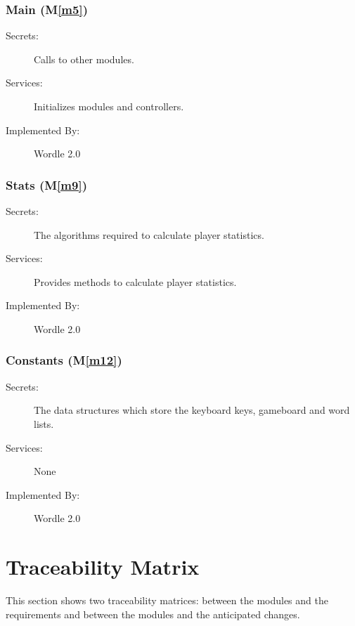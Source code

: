 \documentclass[12pt, titlepage]{article}
\newcommand{\mref}[1]{M\ref{#1}}
\begin{document}
	\subsubsection{Main (\mref{m5})}
	\begin{description}
		\item[Secrets:]Calls to other modules.
		\item[Services:]Initializes modules and controllers.
		\item[Implemented By:] Wordle 2.0
	\end{description}
	
	\subsubsection{Stats (\mref{m9})}
	\begin{description}
		\item[Secrets:]The algorithms required to calculate player statistics.
		\item[Services:]Provides methods to calculate player statistics.
		\item[Implemented By:] Wordle 2.0
	\end{description}
	
	\subsubsection{Constants (\mref{m12})}
	\begin{description}
		\item[Secrets:]The data structures which store the keyboard keys, gameboard and word lists.
		\item[Services:] None
		\item[Implemented By:] Wordle 2.0
	\end{description}
	
	\newpage
	
	\section{Traceability Matrix} \label{SecTM}
	
	This section shows two traceability matrices: between the modules and the
	requirements and between the modules and the anticipated changes.
	
\end{document}
